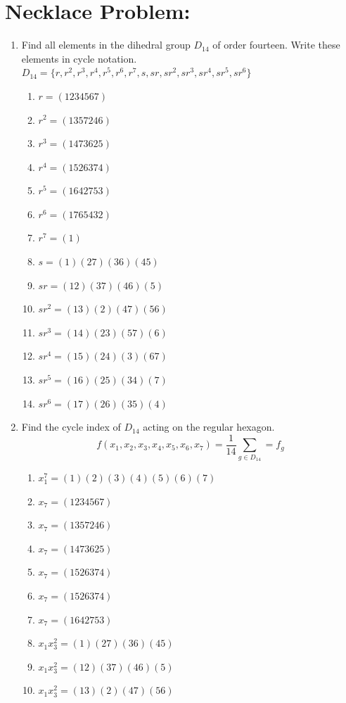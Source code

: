 \documentclass[12pt]{article}
\begin{document}
\section{Necklace Problem:}
\begin{enumerate}[label=(\alph*)]
    \item Find all elements in the dihedral group $D_{14}$ of order fourteen. Write these  elements in cycle notation.
    \newline $D_{14}=\{r,r^2,r^3,r^4,r^5,r^6,r^7,s,sr,sr^2,sr^3,sr^4,sr^5,sr^6\}$
    \begin{enumerate}[label=(\roman*)]
        \item $r=(1234567)$
        \item $r^2=(1357246)$
        \item $r^3=(1473625)$
        \item $r^4=(1526374)$
        \item $r^5=(1642753)$
        \item $r^6=(1765432)$
        \item $r^7=(1)$
        \item $s=(1)(27)(36)(45)$
        \item $sr=(12)(37)(46)(5)$
        \item $sr^2=(13)(2)(47)(56)$
        \item $sr^3=(14)(23)(57)(6)$
        \item $sr^4=(15)(24)(3)(67)$
        \item $sr^5=(16)(25)(34)(7)$
        \item $sr^6=(17)(26)(35)(4)$
    \end{enumerate}
    \item Find the cycle index of $D_{14}$ acting on the regular hexagon.
$$f(x_1,x_2,x_3,x_4,x_5,x_6,x_7)=\frac{1}{14}\sum_{g\in D_{14}}=f_g$$
\begin{enumerate}[label=(\roman*)]
    \item $x_1^7=(1)(2)(3)(4)(5)(6)(7)$
    \item $x_7=(1234567)$
    \item $x_7=(1357246)$
    \item $x_7=(1473625)$
    \item $x_7=(1526374)$
    \item $x_7=(1526374)$
    \item $x_7=(1642753)$
    \item $x_1x_3^2=(1)(27)(36)(45)$
    \item $x_1x_3^2=(12)(37)(46)(5)$
    \item $x_1x_3^2=(13)(2)(47)(56)$

\end{enumerate}
\end{enumerate}
\end{document}
